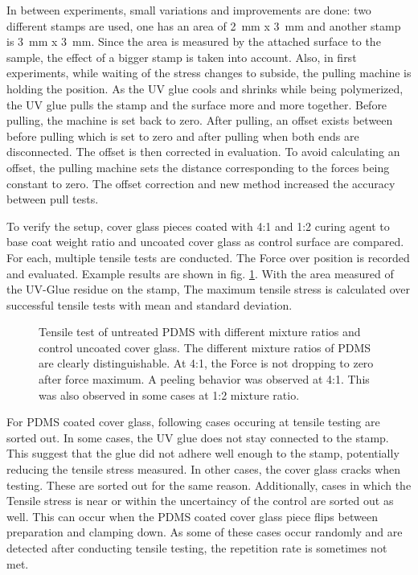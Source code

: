 In between experiments, small variations and improvements are done: two different stamps are used, one has an area of \SI{2}{\milli\meter} x \SI{3}{\milli\meter} and another stamp is \SI{3}{\milli\meter} x \SI{3}{\milli\meter}. Since the area is measured by the attached surface to the sample, the effect of a bigger stamp is taken into account. Also, in first experiments, while waiting of the stress changes to subside, the pulling machine is holding the position. As the UV glue cools and shrinks while being polymerized, the UV glue pulls the stamp and the surface more and more together. Before pulling, the machine is set back to zero. After pulling, an offset exists between before pulling which is set to zero and after pulling when both ends are disconnected. The offset is then corrected in evaluation. To avoid calculating an offset, the pulling machine sets the distance corresponding to the forces being constant to zero. The offset correction and new method increased the accuracy between pull tests.

To verify the setup, cover glass pieces coated with 4:1 and 1:2 curing agent to base coat weight ratio and uncoated cover glass as control surface are compared. For each, multiple tensile tests are conducted. The Force over position is recorded and evaluated. Example results are shown in fig. \ref{fig:forceOverTime}. With the area measured of the UV-Glue residue on the stamp, The maximum tensile stress is calculated over successful tensile tests with mean and standard deviation.  

\begin{figure}[hbt!]
	\centering
	
	\caption{Tensile test of untreated PDMS with different mixture ratios and control uncoated cover glass. The different mixture ratios of PDMS are clearly distinguishable. At 4:1, the Force is not dropping to zero after force maximum. A peeling behavior was observed at 4:1. This was also observed in some cases at 1:2 mixture ratio.}
	\label{fig:forceOverTime}
\end{figure}

For PDMS coated cover glass, following cases occuring at tensile testing are sorted out. In some cases, the UV glue does not stay connected to the stamp. This suggest that the glue did not adhere well enough to the stamp, potentially reducing the tensile stress measured. In other cases, the cover glass cracks when testing. These are sorted out for the same reason. Additionally, cases in which the Tensile stress is near or within the uncertaincy of the control are sorted out as well. This can occur when the PDMS coated cover glass piece flips between preparation and clamping down. As some of these cases occur randomly and are detected after conducting tensile testing, the repetition rate is sometimes not met.

